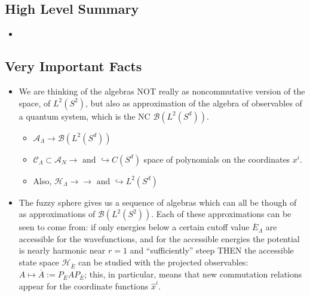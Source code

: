 \documentclass{article}
\newcommand{\cut}[1]{\overline{#1}}
\begin{document}
\subsection{High Level Summary}

    \begin{itemize}

    \item 
    
    \end{itemize}

\subsection{Very Important Facts}

    \begin{itemize}

    \item  We are thinking of the algebras NOT really as noncommutative version of the space, of $L^2(S^2)$, but also as approximation of the algebra of observables of a quantum system, which is the NC $\mathcal B(L^2(S^d))$.
    
        \begin{itemize}
            
        \item $\mathcal A_\Lambda \to \mathcal B(L^2(S^d))$
        
        \item $\mathcal C_\Lambda \subset \mathcal A_N \to \text{ and } \hookrightarrow C(S^d)$ space of polynomials on the coordinates $x^i$.
        
        \item Also, $\mathcal H_\Lambda \to \to \text{ and } \hookrightarrow L^2(S^d)$
            
        \end{itemize}
    
    \item The fuzzy sphere gives us a sequence of algebras which can all be though of as approximations of $\mathcal B(L^2(S^2))$. Each of these approximations can be seen to come from: if only energies below a certain cutoff value $\cut{E}_\Lambda$ are accessible for the wavefunctions, and for the accessible energies the potential is nearly harmonic near $r = 1$ and ``sufficiently'' steep THEN the accessible state space $\mathcal H_{\cut{E}}$ can be studied with the projected observables: $A \mapsto \cut{A} := P_{\overline E} A P_{\overline E}$; this, in particular, means that new commutation relations appear for the coordinate functions $\hat x^i$.
    

\end{itemize}
\end{document}
